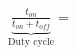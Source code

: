 \documentclass[preview]{standalone}
\begin{document}
\begin{center}
$\underbrace{\frac{t_{on}}{t_{on}+t_{off}}}_{\text{Duty cycle}}=$
\end{center}
\end{document}
